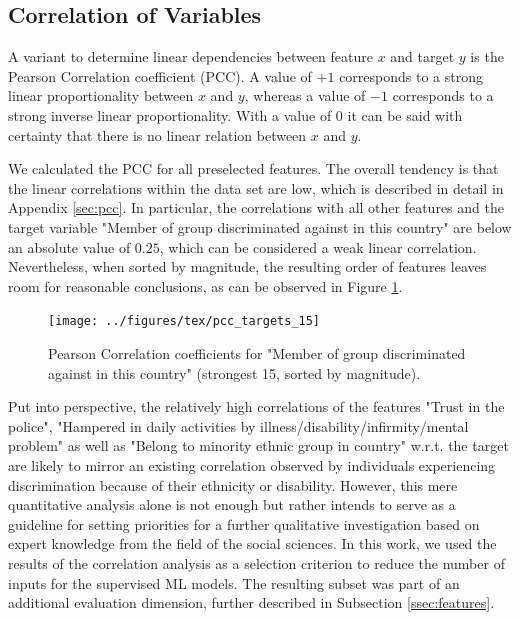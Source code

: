 \documentclass[10pt]{article}
\begin{document}
	\subsection{Correlation of Variables} %
	A variant to determine linear dependencies between feature $x$ and target $y$ is the Pearson Correlation coefficient (PCC). A value of $+1$ corresponds to a strong linear proportionality between $x$ and $y$, whereas a value of $-1$ corresponds to a strong inverse linear proportionality. With a value of $0$ it can be said with certainty that there is no linear relation between $x$ and $y$.
	
	We calculated the PCC for all preselected features. The overall tendency is that the linear correlations within the data set are low, which is described in detail in Appendix \ref{sec:pcc}. In particular, the correlations with all other features and the target variable "Member of group discriminated against in this country" are below an absolute value of $0.25$, which can be considered a weak linear correlation. Nevertheless, when sorted by magnitude, the resulting order of features leaves room for reasonable conclusions, as can be observed in Figure \ref{fig:pcc_targets}. 
	
	\begin{figure}[h]
		\centering
		\texttt{[image: ../figures/tex/pcc\_targets\_15]}
		\caption{Pearson Correlation coefficients for "Member of group discriminated against in this country" (strongest 15, sorted by magnitude).}
		\label{fig:pcc_targets} %
	\end{figure}
	
	Put into perspective, the relatively high correlations of the features "Trust in the police", "Hampered in daily activities by illness/disability/infirmity/mental problem" as well as "Belong to minority ethnic group in country" w.r.t. the target are likely to mirror an existing correlation observed by individuals experiencing discrimination because of their ethnicity or disability. However, this mere quantitative analysis alone is not enough but rather intends to serve as a guideline for setting priorities for a further qualitative investigation based on expert knowledge from the field of the social sciences. 
	In this work, we used the results of the correlation analysis as a selection criterion to reduce the number of inputs for the supervised ML models. The resulting subset was part of an additional evaluation dimension, further described in Subsection \ref{ssec:features}.
	
\end{document}
